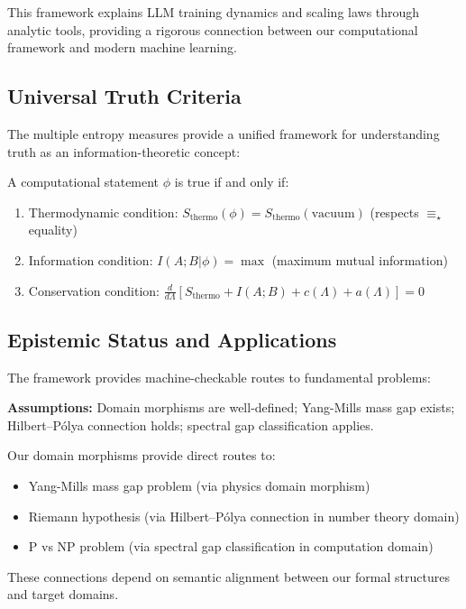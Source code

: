This framework explains LLM training dynamics and scaling laws \cite{kaplan2020,hoffmann2022,hoffmann2022chinchilla} through analytic tools, providing a rigorous connection between our computational framework and modern machine learning.

\subsection{Universal Truth Criteria}

The multiple entropy measures provide a unified framework for understanding truth as an information-theoretic concept:

\begin{definition}
\label{def:info-truth-lbr}
A computational statement $\phi$ is true if and only if:
\begin{enumerate}
\item Thermodynamic condition: $S_{\text{thermo}}(\phi) = S_{\text{thermo}}(\text{vacuum})$ (respects $\equiv_\star$ equality)
\item Information condition: $I(A;B|\phi) = \max$ (maximum mutual information)
\item Conservation condition: $\frac{d}{d\Lambda}[S_{\text{thermo}} + I(A;B) + c(\Lambda) + a(\Lambda)] = 0$
\end{enumerate}
\end{definition}

\subsection{Epistemic Status and Applications}

The framework provides machine-checkable routes to fundamental problems:

\begin{notation}[Hypotheses]
\label{not:hypotheses-applications}
\textbf{Assumptions:} Domain morphisms are well-defined; Yang-Mills mass gap exists; Hilbert–Pólya connection holds; spectral gap classification applies.
\end{notation}

\begin{theorem}
\label{thm:universal-applications}
Our domain morphisms provide direct routes to:
\begin{itemize}
\item Yang-Mills mass gap problem (via physics domain morphism)
\item Riemann hypothesis (via Hilbert–Pólya connection in number theory domain)
\item P vs NP problem (via spectral gap classification in computation domain)
\end{itemize}
These connections depend on semantic alignment between our formal structures and target domains.
\end{theorem}

